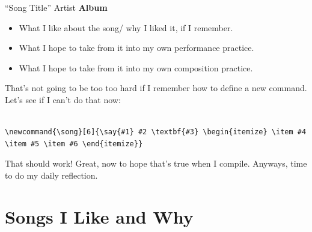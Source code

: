 \documentclass[12pt]{article}
\newcommand{\say}[1]{``#1''}
\renewcommand{\,}{\textsuperscript{,}}
\newcommand{\song}[9]{\item \say{#1} #2 \textbf{#3} (Added to this list: #4) \begin{itemize} \item #5 \item #6 \item #7 \item #8 \item #9 \end{itemize}}
\begin{document}
\say{Song Title} Artist \textbf{Album}  
\begin{itemize}

\item What I like about the song/ why I liked it, if I remember.

\item What I hope to take from it into my own performance practice.

\item What I hope to take from it into my own composition practice.  
\end{itemize}

That's not going to be too too hard if I remember how to define a new command. Let's see if I can't do that now:

\begin{verbatim}

\newcommand{\song}[6]{\say{#1} #2 \textbf{#3} \begin{itemize} \item #4 \item #5 \item #6 \end{itemize}}

\end{verbatim}

That should work! Great, now to hope that's true when I compile.  
Anyways, time to do my daily reflection.

\section{Songs I Like and Why}




\end{document}

